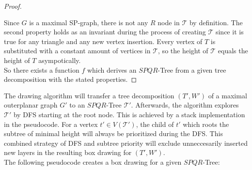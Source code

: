 \begin{proof}
\begin{description}
\begin{figure}[H]
		\end{figure}
	\end{description}
	Since $G$ is a maximal SP-graph, there is not any $R$ node in $\mathcal{T}$ by definition. The second property holds as an invariant during the process of creating $\mathcal{T}$ since it is true for any triangle and any new vertex insertion. Every vertex of $T$ is substituted with a constant amount of vertices in $\mathcal{T}$, so the height of $\mathcal{T}$ equals the height of $T$ asympotically.\\
	So there exists a function $f$ which derives an $SPQR$-Tree from a given tree decomposition with the stated properties.
\end{proof}
The drawing algorithm will transfer a tree decomposition $(T',W')$ of a maximal outerplanar graph $G'$ to an $SPQR$-Tree $\mathcal{T}'$. Afterwards, the algorithm explores $\mathcal{T}'$ by DFS starting at the root node. This is achieved by a stack implementation in the pseudocode. For a vertex $t'\in V(\mathcal{T'})$, the child of $t'$ which roots the subtree of minimal height will always be prioritized during the DFS. This combined strategy of DFS and subtree priority will exclude unneccesarily inserted new layers in the resulting box drawing for $(T',W')$.\\
The following pseudocode creates a box drawing for a given $SPQR$-Tree:\\
